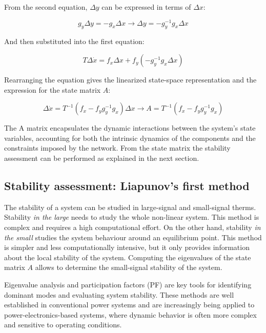 From the second equation, $\Delta y$ can be expressed in terms of $\Delta x$:

\begin{equation}
    g_y\Delta y = -g_x \Delta x  \to \Delta y = - g_y^{-1} g_x \Delta x 
\end{equation}

And then substituted into the first equation:

\begin{equation}
    T \Delta \dot{x} = f_x\Delta x +f_y (- g_y^{-1} g_x  \Delta x) 
\end{equation}


Rearranging the equation gives the linearized state-space representation and the expression for the state matrix $A$:

\begin{equation}
    \Delta \dot{x} = T^{-1}(f_x-f_yg_y^{-1}g_x) \Delta x  \to A=T^{-1} (f_x-f_yg_y^{-1}g_x) 
\end{equation}


The A matrix encapsulates the dynamic interactions between the system's state variables, accounting for both the intrinsic dynamics of the components and the constraints imposed by the network. 
From the state matrix the stability assessment can be performed as explained in the next section.

\subsection{Stability assessment: Liapunov's first method}

The stability of a system can be studied in large-signal and small-signal therms. Stability \textit{in the large} needs to study the whole non-linear system. This method is complex and requires a high
computational effort. On the other hand, stability \textit{in the small} studies the system behaviour around an equilibrium point. This method is simpler and less computationally intensive, but it only 
provides information about the local stability of the system. Computing the eigenvalues of the state matrix $A$ allows to determine the small-signal stability of the system.

Eigenvalue analysis and participation factors (PF) are key tools for identifying dominant modes and evaluating system stability. These methods are well established in conventional 
power systems and are increasingly being applied to power-electronics-based systems, where dynamic behavior is often more complex and sensitive to operating conditions.

